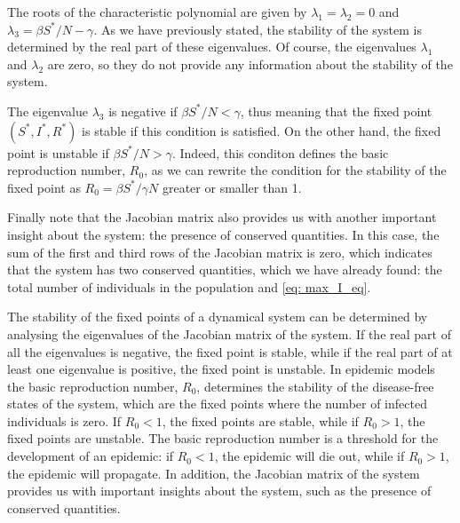 The roots of the characteristic polynomial are given by $\lambda_1=\lambda_2=0$
and $\lambda_3=\beta S^*/N-\gamma$. As we have previously stated, the stability
of the system is determined by the real part of these eigenvalues. Of course,
the eigenvalues $\lambda_1$ and $\lambda_2$ are zero, so they do not provide
any information about the stability of the system.

The eigenvalue $\lambda_3$ is negative if $\beta S^*/N<\gamma$, thus meaning
that the fixed point $(S^*,I^*,R^*)$ is stable if this condition is satisfied.
On the other hand, the fixed point is unstable if $\beta S^*/N>\gamma$. Indeed,
this conditon defines the basic reproduction number, $R_0$, as we can rewrite
the condition for the stability of the fixed point as $R_0=\beta S^*/\gamma N$
greater or smaller than 1.

Finally note that the Jacobian matrix also provides us with another important
insight about the system: the presence of conserved quantities. In this case,
the sum of the first and third rows of the Jacobian matrix is zero, which
indicates that the system has two conserved quantities, which we have already
found: the total number of individuals in the population and \cref{eq:
  max_I_eq}.

\begin{remark}
  The stability of the fixed points of a dynamical system can be determined by
  analysing the eigenvalues of the Jacobian matrix of the system. If the real
  part of all the eigenvalues is negative, the fixed point is stable, while if
  the real part of at least one eigenvalue is positive, the fixed point is
  unstable. In epidemic models the basic reproduction number, $R_0$, determines
  the	stability of the disease-free states of the system, which are the fixed
  points where the number of infected individuals is zero. If $R_0<1$, the
  fixed points are stable, while if $R_0>1$, the fixed points are unstable.
  The basic reproduction number is a threshold for the development of an
  epidemic: if $R_0<1$, the epidemic will die out, while if $R_0>1$, the
  epidemic will propagate. In addition, the Jacobian matrix of the system
  provides us with important insights about the system, such as the presence of
  conserved quantities.
\end{remark}

